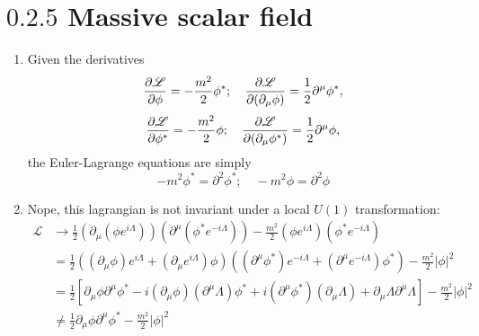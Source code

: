 \documentclass[12pt]{article}
\newcommand{\magsq}[1]{\big|#1\big|^2}
\begin{document}
\section*{$0.2.5$ Massive scalar field}
\begin{enumerate}[label=(\alph*)]
    \item Given the derivatives
    \[ \pdv{\mathscr{L}}{\phi} = -\frac{m^2}{2}\phi^*; \quad \pdv{\mathscr{L}}{(\partial_\mu\phi)} = \frac{1}{2}\partial^\mu\phi^*, \]
    \[ \pdv{\mathscr{L}}{\phi^*} = -\frac{m^2}{2}\phi; \quad \pdv{\mathscr{L}}{(\partial_\mu\phi^*)} = \frac{1}{2}\partial^\mu\phi, \]
    the Euler-Lagrange equations are simply
    \[ \boxed{-m^2\phi^* = \partial^2\phi^*; \quad -m^2\phi = \partial^2\phi} \]
    
    \item Nope, this lagrangian is not invariant under a local $U(1)$ transformation:
    \begin{align*}
        \mathscr{L} &\to \frac{1}{2}\left(\partial_\mu\left(\phi e^{i\Lambda}\right)\right)\left(\partial^\mu\left(\phi^* e^{-i\Lambda}\right)\right) - \frac{m^2}{2}\left(\phi e^{i\Lambda}\right)\left(\phi^* e^{-i\Lambda}\right) \\
        &= \frac{1}{2}\left(\left(\partial_\mu \phi\right)e^{i\Lambda} + \left(\partial_\mu e^{i\Lambda}\right)\phi\right)\left(\left(\partial^\mu \phi^*\right)e^{-i\Lambda} + \left(\partial^\mu e^{-i\Lambda}\right)\phi^*\right) - \frac{m^2}{2}\magsq{\phi} \\
        &= \frac{1}{2}\left[\partial_\mu\phi\partial^\mu\phi^* - i\left(\partial_\mu\phi\right)\left(\partial^\mu\Lambda\right)\phi^* + i\left(\partial^\mu\phi^*\right)\left(\partial_\mu\Lambda\right) + \partial_\mu\Lambda\partial^\mu\Lambda\right] - \frac{m^2}{2}\magsq{\phi} \\
        &\neq \frac{1}{2}\partial_\mu\phi\partial^\mu\phi^* - \frac{m^2}{2}\magsq{\phi}
    \end{align*}
\end{enumerate}
\end{document}
